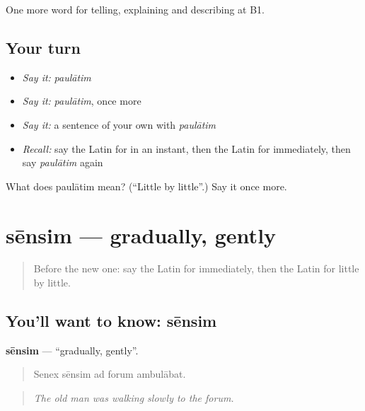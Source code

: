 \begin{grammarlens}[title={What you've built}]
One more word for telling, explaining and describing at B1.
\end{grammarlens}

\subsection*{Your turn}
\begin{itemize}
\raggedright
  \item \emph{Say it:} \emph{paulātim}
  \item \emph{Say it:} \emph{paulātim}, once more
  \item \emph{Say it:} a sentence of your own with \emph{paulātim}
  \item \emph{Recall:} say the Latin for in an instant, then the Latin for immediately, then say \emph{paulātim} again
\end{itemize}

\begin{tcolorbox}[breakable,colback=teal!4,colframe=teal!35!black,title={Before you move on}]
What does paulātim mean? (\textquotedblleft{}Little by little\textquotedblright{}.) Say it once more.
\end{tcolorbox}
\section[sēnsim]{sēnsim — gradually, gently}

\label{lesson:LA-C293-sensim}



\begin{quote}
Before the new one: say the Latin for immediately, then the Latin for little by little.
\end{quote}

\subsection*{You'll want to know: sēnsim}
\textbf{sēnsim} — \textquotedblleft{}gradually, gently\textquotedblright{}.

\begin{quote}
Senex sēnsim ad forum ambulābat.
\end{quote}

\begin{quote}
\emph{The old man was walking slowly to the forum.}
\end{quote}

